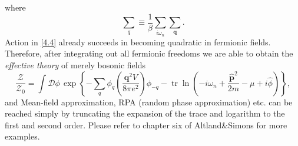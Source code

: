 \documentclass[10pt,nofootinbib]{revtex4}
\begin{document}
	where
	\begin{equation*}
		\sum_q\equiv\dfrac{1}{\beta}\sum_{i\omega_n}\sum_{\bm{q}}.
	\end{equation*}
	Action in \eqref{4.4} already succeeds in becoming {\color{red}quadratic} in fermionic fields. Therefore, after integrating out all fermionic freedoms we are able to obtain the \emph{effective theory} of merely bosonic fields
	\begin{equation}\label{4.5}
		\dfrac{\mathcal{Z}}{\mathcal{Z}_0}=\int\mathcal{D}\phi\,\exp \left\{-\sum_{q}\phi_q\left(\dfrac{\bm{q}^2V}{8\pi e^2}\right)\phi_{-q}-\mathop{\mathrm{tr}}\ln\left(-i\omega_n+\dfrac{\hat{\bm{p}}^2}{2m}-\mu+i\hat{\phi}\right)\right\},
	\end{equation}
	and Mean-field approximation, RPA (random phase approximation) etc. can be reached simply by truncating the expansion of the trace and logarithm to the first and second order. Please refer to chapter six of Altland\&Simons for more examples.
\end{document}
